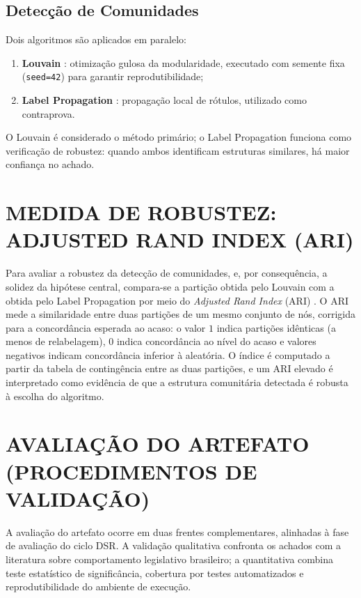 \documentclass[
      12pt,
      a4paper,
      openright,
      oneside,
      chapter=TITLE,
      section=TITLE,
      english,
      french,
      spanish,
      brazilian
    ]{abntex2}
\begin{document}
    \subsection{Detecção de Comunidades}
    
    Dois algoritmos são aplicados em paralelo:
    
    \begin{enumerate}[label=\alph*)]
        \item \textbf{Louvain} \cite{blondel2008}: otimização gulosa da modularidade, executado com semente fixa (\texttt{seed=42}) para garantir reprodutibilidade;
        \item \textbf{Label Propagation} \cite{raghavan2007}: propagação local de rótulos, utilizado como contraprova.
    \end{enumerate}
    
    O Louvain é considerado o método primário; o Label Propagation funciona como verificação de robustez: quando ambos identificam estruturas similares, há maior confiança no achado.
    
    \section{MEDIDA DE ROBUSTEZ: ADJUSTED RAND INDEX (ARI)}
    \label{sec:ari}
    
    Para avaliar a robustez da detecção de comunidades, e, por consequência, a
    solidez da hipótese central, compara-se a partição obtida pelo Louvain com a
    obtida pelo Label Propagation por meio do \textit{Adjusted Rand Index} (ARI) \cite{hubert1985}. O
    ARI mede a similaridade entre duas partições de um mesmo conjunto de nós,
    corrigida para a concordância esperada ao acaso: o valor $1$ indica partições
    idênticas (a menos de relabelagem), $0$ indica concordância ao nível do acaso e
    valores negativos indicam concordância inferior à aleatória. O índice é computado
    a partir da tabela de contingência entre as duas partições, e um ARI elevado é
    interpretado como evidência de que a estrutura comunitária detectada é robusta à
    escolha do algoritmo.
    
    \section{AVALIAÇÃO DO ARTEFATO (PROCEDIMENTOS DE VALIDAÇÃO)}
    
    A avaliação do artefato ocorre em duas frentes complementares, alinhadas à fase
    de avaliação do ciclo DSR. A validação qualitativa confronta os achados com a
    literatura sobre comportamento legislativo brasileiro; a quantitativa combina
    teste estatístico de significância, cobertura por testes automatizados e
    reprodutibilidade do ambiente de execução.
    
\end{document}
